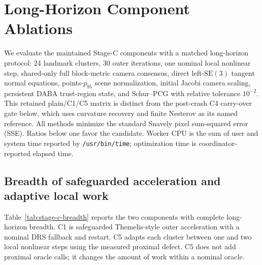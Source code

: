 
\section{Long-Horizon Component Ablations}
\label{sec:stage-c-long-horizon}

We evaluate the maintained Stage-C components with a matched long-horizon
protocol: 24 landmark clusters, 30 outer iterations, one nominal local
nonlinear step, shared-only full block-metric camera consensus, direct
left-$\mathrm{SE}(3)$ tangent normal equations, points-$p_{95}$ scene
normalization, initial Jacobi camera scaling, persistent DABA trust-region
state, and Schur--PCG with relative tolerance $10^{-2}$.  This retained
plain/C1/C5 matrix is distinct from the post-crash C4 carry-over gate below,
which uses curvature recovery and finite Nesterov as its named reference.  All methods minimize
the standard Snavely pixel sum-squared error (SSE).  Ratios below one favor the
candidate.  Worker CPU is the sum of user and system time reported by
\texttt{/usr/bin/time}; optimization time is coordinator-reported elapsed time.

\subsection{Breadth of safeguarded acceleration and adaptive local work}

Table~\ref{tab:stage-c-breadth} reports the two components with complete
long-horizon breadth.  C1 is safeguarded Themelis-style outer acceleration with
a nominal DRS fallback and restart.  C5 adapts each cluster between one and two
local nonlinear steps using the measured proximal defect.  C5 does not add
proximal oracle calls; it changes the amount of work within a nominal oracle.

